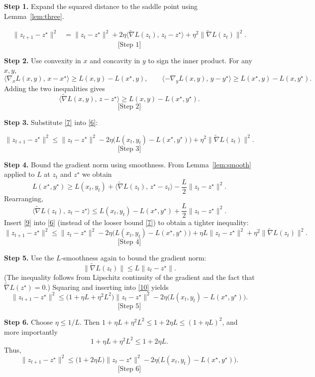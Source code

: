 \documentclass{article}
\begin{document}
\bigskip
\noindent\textbf{Step 1.}  Expand the squared distance to the saddle point using Lemma~\ref{lem:three}.

\[
\begin{aligned}
\|z_{t+1}-z^\star\|^2
&= \|z_t-z^\star\|^2
   +2\eta\langle \tilde\nabla L(z_t),\,z_t-z^\star\rangle
   +\eta^2\|\tilde\nabla L(z_t)\|^2 .
\end{aligned}
\tag{6}
\]
\[
\text{[Step 1]}
\]

\bigskip
\noindent\textbf{Step 2.}  Use convexity in $x$ and concavity in $y$ to sign the inner product.
For any $x,y$,
\[
\langle \nabla_x L(x,y),\,x-x^\star\rangle \ge L(x,y)-L(x^\star,y),\qquad
\langle -\nabla_y L(x,y),\,y-y^\star\rangle \ge L(x^\star,y)-L(x,y^\star).
\]
Adding the two inequalities gives
\[
\langle \tilde\nabla L(x,y),\,z-z^\star\rangle
\ge L(x,y)-L(x^\star,y^\star).
\tag{7}
\]
\[
\text{[Step 2]}
\]

\bigskip
\noindent\textbf{Step 3.}  Substitute \eqref{7} into \eqref{6}:

\[
\|z_{t+1}-z^\star\|^2
\le \|z_t-z^\star\|^2
   -2\eta\big(L(x_t,y_t)-L(x^\star,y^\star)\big)
   +\eta^2\|\tilde\nabla L(z_t)\|^2 .
\tag{8}
\]
\[
\text{[Step 3]}
\]

\bigskip
\noindent\textbf{Step 4.}  Bound the gradient norm using smoothness. From Lemma~\ref{lem:smooth} applied to $L$ at $z_t$ and $z^\star$ we obtain
\[
L(x^\star,y^\star)\ge L(x_t,y_t)
      +\langle \tilde\nabla L(z_t),\,z^\star-z_t\rangle
      -\frac{L}{2}\|z_t-z^\star\|^2 .
\]
Rearranging,
\[
\langle \tilde\nabla L(z_t),\,z_t-z^\star\rangle
\le L(x_t,y_t)-L(x^\star,y^\star)+\frac{L}{2}\|z_t-z^\star\|^2 .
\tag{9}
\]
Insert \eqref{9} into \eqref{6} (instead of the looser bound \eqref{7}) to obtain a tighter inequality:
\[
\|z_{t+1}-z^\star\|^2
\le \|z_t-z^\star\|^2
    -2\eta\big(L(x_t,y_t)-L(x^\star,y^\star)\big)
    +\eta L\|z_t-z^\star\|^2
    +\eta^2\|\tilde\nabla L(z_t)\|^2 .
\tag{10}
\]
\[
\text{[Step 4]}
\]

\bigskip
\noindent\textbf{Step 5.}  Use the $L$‑smoothness again to bound the gradient norm:
\[
\|\tilde\nabla L(z_t)\| \le L\|z_t-z^\star\| .
\tag{11}
\]
(The inequality follows from Lipschitz continuity of the gradient and the fact that $\tilde\nabla L(z^\star)=0$.)
Squaring and inserting into \eqref{10} yields
\[
\|z_{t+1}-z^\star\|^2
\le \big(1+ \eta L + \eta^2 L^2\big)\|z_t-z^\star\|^2
    -2\eta\big(L(x_t,y_t)-L(x^\star,y^\star)\big) .
\tag{12}
\]
\[
\text{[Step 5]}
\]

\bigskip
\noindent\textbf{Step 6.}  Choose $\eta\le 1/L$.
Then $1+\eta L+\eta^2L^2\le 1+2\eta L\le (1+\eta L)^2$, and more importantly
\[
1+\eta L+\eta^2 L^2 \le 1+2\eta L .
\tag{13}
\]
Thus,
\[
\|z_{t+1}-z^\star\|^2
\le \big(1+2\eta L\big)\|z_t-z^\star\|^2
    -2\eta\big(L(x_t,y_t)-L(x^\star,y^\star)\big) .
\tag{14}
\]
\[
\text{[Step 6]}
\]
\end{document}
